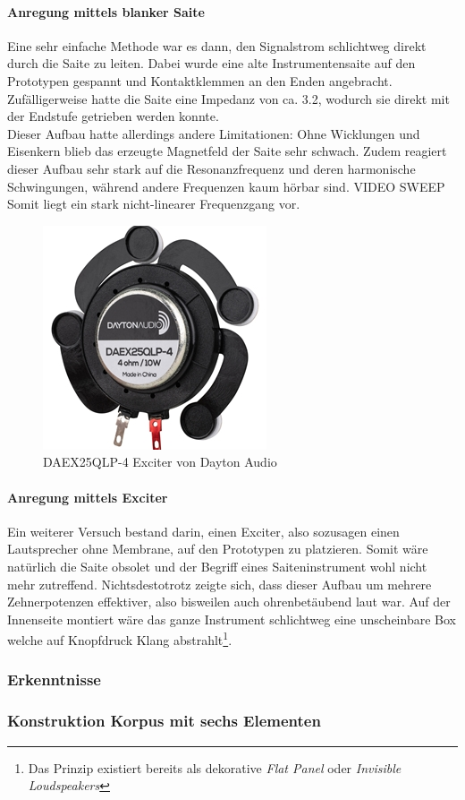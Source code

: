 \paragraph{Anregung mittels blanker Saite}
Eine sehr einfache Methode war es dann, den Signalstrom schlichtweg direkt durch die Saite zu leiten. Dabei wurde eine alte Instrumentensaite auf den Prototypen gespannt und Kontaktklemmen an den Enden angebracht. Zufälligerweise hatte die Saite eine Impedanz von ca. 3.2\Omega, wodurch sie direkt mit der Endstufe getrieben werden konnte.\\Dieser Aufbau hatte allerdings andere Limitationen: Ohne Wicklungen und Eisenkern blieb das erzeugte Magnetfeld der Saite sehr schwach. Zudem reagiert dieser Aufbau sehr stark auf die Resonanzfrequenz und deren harmonische Schwingungen, während andere Frequenzen kaum hörbar sind. {\color{red} VIDEO SWEEP} Somit liegt ein stark nicht-linearer Frequenzgang vor.
\begin{figure}
	\vspace{10mm}
	\centering
	\includegraphics[scale=0.6]{pictures/exciter.jpg}
	\caption{DAEX25QLP-4 Exciter von Dayton Audio}
	\label{pics:exciter}
\end{figure}
\paragraph{Anregung mittels Exciter}
Ein weiterer Versuch bestand darin, einen Exciter, also sozusagen einen Lautsprecher ohne Membrane, auf den Prototypen zu platzieren. Somit wäre natürlich die Saite obsolet und der Begriff eines Saiteninstrument wohl nicht mehr zutreffend. Nichtsdestotrotz zeigte sich, dass dieser Aufbau um mehrere Zehnerpotenzen effektiver, also bisweilen auch ohrenbetäubend laut war. Auf der Innenseite montiert wäre das ganze Instrument schlichtweg eine unscheinbare Box welche auf Knopfdruck Klang abstrahlt\footnote{Das Prinzip existiert bereits als dekorative \textit{Flat Panel} oder \textit{Invisible Loudspeakers}}.
\subsubsection{Erkenntnisse}
\subsubsection{Konstruktion Korpus mit sechs Elementen}